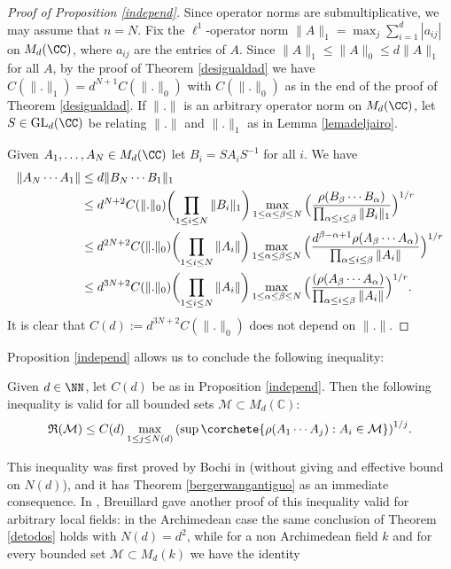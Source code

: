\begin{proof}[Proof of Proposition \ref{independ}]
Since operator norms are submultiplicative, we may assume that $n=N$. Fix the $\ell^1$-operator norm $\|A\|_{1}=\max_{j}{\sum_{i=1}^{d}|a_{ij}|}$ on $M_{d}(\CC)$, where $a_{ij}$ are the entries of $A$. Since $\|A\|_1 \leq \|A\|_0 \leq d\|A\|_1$ for all $A$, by the proof of Theorem \ref{desigualdad} we have $C(\|.\|_1)=d^{N+1}C(\|.\|_0)$ with $C(\|.\|_0)$ as in the end of the proof of Theorem \ref{desigualdad}. If $\|.\|$ is an arbitrary operator norm on $M_{d}(\CC)$, let $S\in \mathrm{GL}_{d}(\CC)$ be relating $\|.\|$ and $\|.\|_{1}$ as in Lemma \ref{lemadeljairo}.

Given $A_{1},\dots,A_{N}\in M_{d}(\CC)$ let $B_{i}=SA_{i}S^{-1}$ for all $i$. We have
\begin{equation*}
\begin{split}
\|A_N\cdots A_1\| & \leq d\|B_N\cdots B_1\|_{1} \\
& \leq d^{N+2}C(\|.\|_0) \biggl(\prod_{1\leq i\leq N}{\|B_i\|_1}\biggr)\max_{1\leq \alpha\leq \beta\leq N}{ \Bigl( \frac{\rho(B_{\beta}\cdots B_{\alpha}) }{ \prod_{\alpha\leq i\leq \beta}{\|B_i\|_1}} \Bigr)^{1/r}} \\
& \leq d^{2N+2}C(\|.\|_0)\biggl(\prod_{1\leq i\leq N}{\|A_i\|}\biggr)\max_{1\leq \alpha\leq \beta\leq N}{ \Bigl( \frac{{d}^{\beta-\alpha+1}\rho(A_{\beta}\cdots A_{\alpha}) }{ \prod_{\alpha\leq i\leq \beta}{\|A_i\|}} \Bigr)^{1/r}} \\
& \leq d^{3N+2}C(\|.\|_0)\biggl(\prod_{1\leq i\leq N}{\|A_i\|}\biggr)\max_{1\leq \alpha\leq \beta\leq N}{ \Bigl( \frac{(\rho(A_{\beta}\cdots A_{\alpha}) }{ \prod_{\alpha\leq i\leq \beta}{\|A_i\|}} \Bigr)^{1/r}}.
\end{split}
\end{equation*}
It is clear that $C(d):=d^{3N+2}C(\|.\|_0)$ does not depend on $\|.\|$.
\end{proof}
Proposition \ref{independ} allows us to conclude the following inequality:
\begin{teo}\label{detodos} Given $d\in \NN$, let $C(d)$ be as in Proposition \ref{independ}. Then the following inequality is valid for all bounded sets $\mathcal{M}\subset M_{d}(\mathbb{C})$:
\begin{equation*}
\mathfrak{R}(\mathcal{M})\leq C(d)\max_{1\leq j\leq N(d)}{\left(\sup\corchete{\rho(A_{1}\cdots A_{j}) : A_{i}\in \mathcal{M}}\right)^{1/j}}.
\end{equation*}
\end{teo}
This inequality was first proved by Bochi in \cite{bociineq} (without giving and effective bound on $N(d)$), and it has Theorem \ref{bergerwangantiguo} as an immediate consequence. In \cite[Lem.\,2.1]{bro}, Breuillard gave another proof of this inequality valid for arbitrary local fields: in the Archimedean case the same conclusion of Theorem \ref{detodos} holds with $N(d)=d^2$, while for a non Archimedean field $k$ and for every bounded set $\mathcal{M}\subset M_d(k)$ we have the identity
